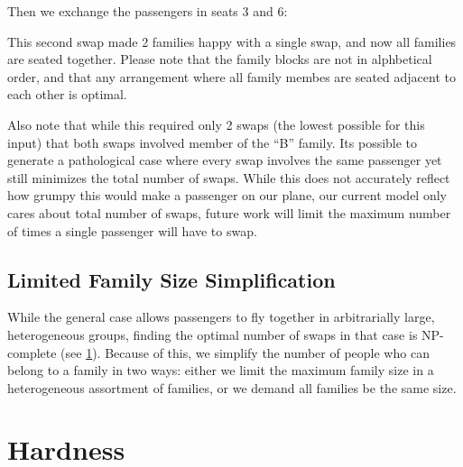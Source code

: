 \documentclass[a4paper]{article}
\begin{document}
Then we exchange the passengers in seats 3 and 6:

\begin{figure}[H]
\centering
{}
\end{figure}

This second swap made 2 families happy with a single swap, and now all families are seated together. Please note that the family blocks are not in alphbetical order, and that any arrangement where all family membes are seated adjacent to each other is optimal.  

Also note that while this required only 2 swaps (the lowest possible for this input) that both swaps involved member of the ``B'' family.  Its possible to generate a pathological case where every swap involves the same passenger yet still minimizes the total number of swaps.  While this does not accurately reflect how grumpy this would make a passenger on our plane, our current model only cares about total number of swaps, future work will limit the maximum number of times a single passenger will have to swap.

\subsection{Limited Family Size Simplification}

While the general case allows passengers to fly together in arbitrarially large, heterogeneous groups, finding the optimal number of swaps in that case is NP-complete (see \ref{sec:hardness}).  Because of this, we simplify the number of people who can belong to a family in two ways: either we limit the maximum family size in a heterogeneous assortment of families, or we demand all families be the same size.  

\section{Hardness} \label{sec:hardness}
\end{document}
